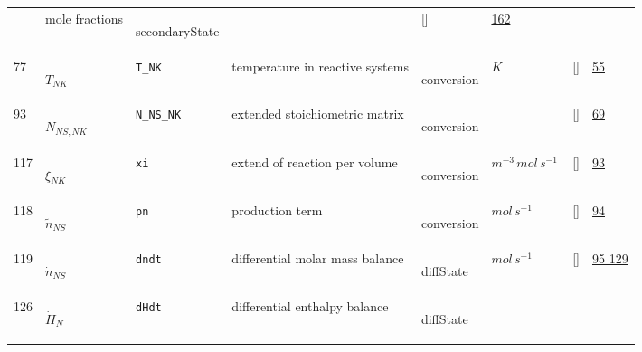 \begin{longtable}{|p{1cm}|p{3cm}|p{3cm}|p{7cm}|p{3.0cm}|p{3cm}|p{2cm}|p{1cm}|}
             & mole fractions 
             & \begin{lay}secondaryState \end{lay}
             & $  $
             & []
             & \hyperlink{"e:162"}{ 162 }
                 \\
    77
             & \hypertarget{"v:77"}{ $ {T}{_{{N K}}} $}
             & \verb|T_NK|
             & temperature in reactive systems
             & \begin{lay}conversion \end{lay}
             & $ K \, $
             & []
             & \hyperlink{"e:55"}{ 55 }
                 \\
    93
             & \hypertarget{"v:93"}{ $ {N}{_{{N S}, {N K}}} $}
             & \verb|N_NS_NK|
             & extended stoichiometric matrix
             & \begin{lay}conversion \end{lay}
             & $  $
             & []
             & \hyperlink{"e:69"}{ 69 }
                 \\
    117
             & \hypertarget{"v:117"}{ $ {\xi}{_{{N K}}} $}
             & \verb|xi|
             & extend of reaction per volume
             & \begin{lay}conversion \end{lay}
             & $ m^{-3} \,mol \,s^{-1} \, $
             & []
             & \hyperlink{"e:93"}{ 93 }
                 \\
    118
             & \hypertarget{"v:118"}{ $ {\tilde{n}}{_{{N S}}} $}
             & \verb|pn|
             & production term
             & \begin{lay}conversion \end{lay}
             & $ mol \,s^{-1} \, $
             & []
             & \hyperlink{"e:94"}{ 94 }
                 \\
    119
             & \hypertarget{"v:119"}{ $ {\dot{n}}{_{{N S}}} $}
             & \verb|dndt|
             & differential molar mass balance
             & \begin{lay}diffState \end{lay}
             & $ mol \,s^{-1} \, $
             & []
             & \hyperlink{"e:95"}{ 95 }
                 \hyperlink{"e:129"}{ 129 }
                 \\
    126
             & \hypertarget{"v:126"}{ $ {\dot{H}}{_{N}} $}
             & \verb|dHdt|
             & differential enthalpy balance
             & \begin{lay}diffState \end{lay}

\end{longtable}
